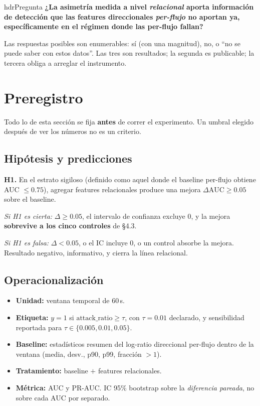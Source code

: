 \documentclass[11pt]{article}
\begin{document}
\begin{cbox}{hdr}{Pregunta}
\textbf{¿La asimetría medida a nivel \emph{relacional} aporta información de detección que las features direccionales \emph{per-flujo} no aportan ya, específicamente en el régimen donde las per-flujo fallan?}
\end{cbox}

Las respuestas posibles son enumerables: sí (con una magnitud), no, o ``no se puede saber con estos datos''. Las tres son resultados; la segunda es publicable; la tercera obliga a arreglar el instrumento.

\section{Preregistro}

Todo lo de esta sección se fija \textbf{antes} de correr el experimento. Un umbral elegido después de ver los números no es un criterio.

\subsection{Hipótesis y predicciones}

\textbf{H1.} En el estrato sigiloso (definido como aquel donde el baseline per-flujo obtiene AUC $\le 0.75$), agregar features relacionales produce una mejora $\Delta \text{AUC} \ge 0.05$ sobre el baseline.

\emph{Si H1 es cierta:} $\Delta \ge 0.05$, el intervalo de confianza excluye $0$, y la mejora \textbf{sobrevive a los cinco controles} de \S4.3.

\emph{Si H1 es falsa:} $\Delta < 0.05$, o el IC incluye $0$, o un control absorbe la mejora. Resultado negativo, informativo, y cierra la línea relacional.

\subsection{Operacionalización}

\begin{itemize}[leftmargin=1.3em,itemsep=1pt]
  \item \textbf{Unidad:} ventana temporal de 60\,s.
  \item \textbf{Etiqueta:} $y = 1$ si $\text{attack\_ratio} \ge \tau$, con $\tau = 0.01$ declarado, y sensibilidad reportada para $\tau \in \{0.005, 0.01, 0.05\}$.
  \item \textbf{Baseline:} estadísticos resumen del log-ratio direccional per-flujo dentro de la ventana (media, desv., p90, p99, fracción $>1$).
  \item \textbf{Tratamiento:} baseline $+$ features relacionales.
  \item \textbf{Métrica:} AUC y PR-AUC. IC 95\% bootstrap sobre la \emph{diferencia pareada}, no sobre cada AUC por separado.
\end{itemize}
\end{document}
